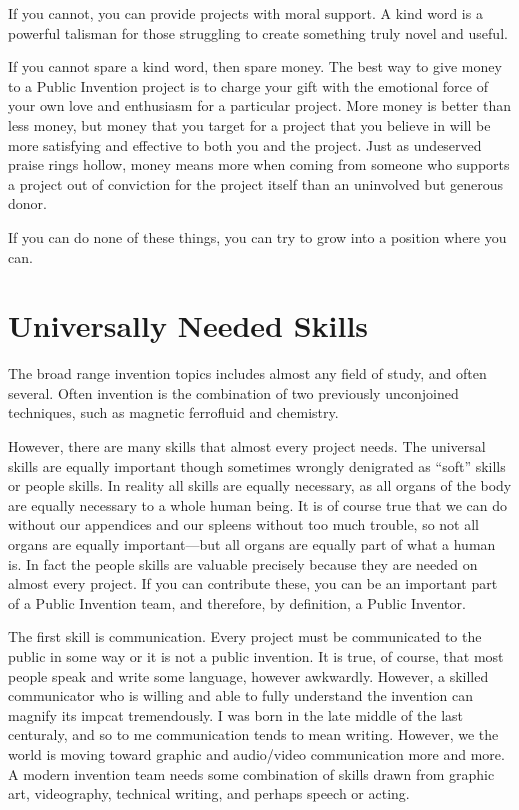 \documentclass[
	fontsize=10pt, %
	twoside=false, %
	secnumdepth=1, %
]{kaobook}
\begin{document}
If you cannot, you can provide projects with moral support.
A kind word is a powerful talisman for those struggling
to create something truly novel and useful.

If you cannot spare a kind word, then spare money.
The best way to give money to a Public Invention project is
to charge your gift with the emotional force of your own
love and enthusiasm for a particular project.
More money is better than less money, but money that
you target for a project that you believe in will be
more satisfying and effective to both you and the project.
Just as undeserved praise rings hollow,
money means more when coming from someone who
supports a project out of conviction for
the project itself than an uninvolved but generous donor.

If you can do none of these things, you can try
to grow into a position where you can.

\section{Universally Needed Skills}

\label{sec:universallyneeded}

The broad range invention topics includes almost any field of study, and
often several.
Often invention is the combination of two previously unconjoined techniques,
such as magnetic ferrofluid and chemistry.

However, there are many skills that almost every project needs.
The universal skills are equally important though sometimes wrongly denigrated as ``soft'' skills
or people skills.
In reality all skills are equally necessary, as all organs of the body are equally necessary to
a whole human being.
It is of course true that we can do without our appendices and our spleens without too much trouble,
so not all organs are equally important---but all organs are equally part of what a human is.
In fact the people skills are valuable precisely because they are needed on almost every project.
If you can contribute these, you can be an important part of a Public Invention team, and therefore,
by definition, a Public Inventor.

The first skill is communication. Every project must be communicated to the public in some way
or it is not a public invention. It is true, of course, that most people speak and write some language,
however awkwardly. However, a skilled communicator who is willing and able to fully understand the
invention can magnify its impcat tremendously.
I was born in the late middle of the last centuraly, and so to me communication tends to mean writing.
However, we the world is moving toward graphic and audio/video communication more and more.
A modern invention team needs some combination of skills drawn from graphic art, videography,
technical writing, and perhaps speech or acting.
\end{document}
